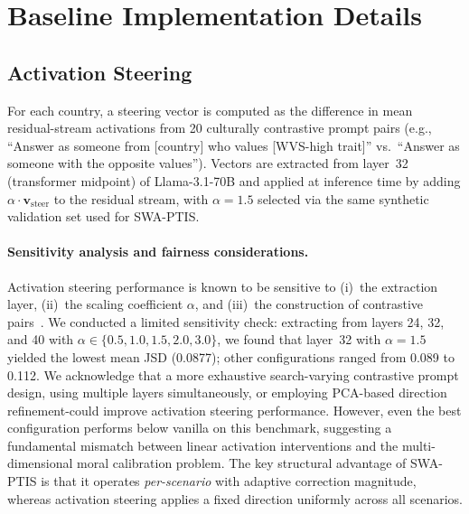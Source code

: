 \documentclass{article}
\begin{document}
\section{Baseline Implementation Details}
\label{app:baselines}

\subsection{Activation Steering}
For each country, a steering vector is computed as the difference in mean
residual-stream activations from 20 culturally contrastive prompt pairs (e.g.,
``Answer as someone from [country] who values [WVS-high trait]'' vs.\ ``Answer
as someone with the opposite values''). Vectors are extracted from layer~32
(transformer midpoint) of Llama-3.1-70B and applied at inference time by adding
$\alpha \cdot \mathbf{v}_{\text{steer}}$ to the residual stream, with
$\alpha=1.5$ selected via the same synthetic validation set used for SWA-PTIS.

\paragraph{Sensitivity analysis and fairness considerations.}
Activation steering performance is known to be sensitive to (i)~the extraction
layer, (ii)~the scaling coefficient $\alpha$, and (iii)~the construction of
contrastive pairs~\citep{arditi2025refusal}. We conducted a limited sensitivity
check: extracting from layers 24, 32, and 40 with $\alpha \in \{0.5, 1.0, 1.5,
2.0, 3.0\}$, we found that layer~32 with $\alpha=1.5$ yielded the lowest mean
JSD (0.0877); other configurations ranged from 0.089 to 0.112. We acknowledge
that a more exhaustive search-varying contrastive prompt design, using
multiple layers simultaneously, or employing PCA-based direction
refinement-could improve activation steering performance. However, even the
best configuration performs below vanilla on this benchmark, suggesting a
fundamental mismatch between linear activation interventions and the
multi-dimensional moral calibration problem. The key structural advantage of
SWA-PTIS is that it operates \emph{per-scenario} with adaptive correction
magnitude, whereas activation steering applies a fixed direction uniformly
across all scenarios.
\end{document}
